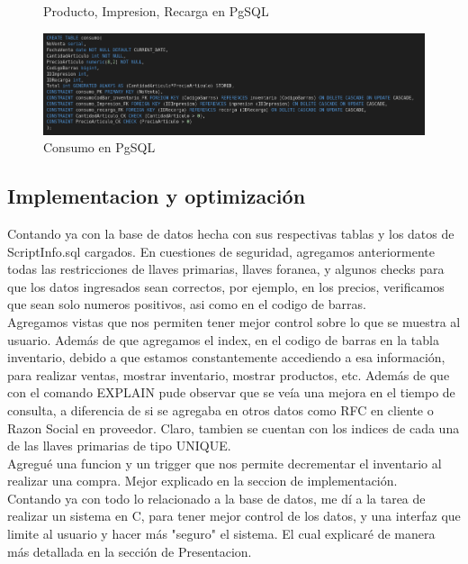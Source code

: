 \documentclass[letter,12pt]{article}
\begin{document}
\begin{center}
\begin{figure}[H]
\caption{Producto, Impresion, Recarga en PgSQL}
\end{figure}
\begin{figure}[H]
\includegraphics[scale=.45]{consumoBD.png}
\caption{Consumo en PgSQL}
\end{figure}
\end{center}
\subsection{Implementacion y optimización}
Contando ya con la base de datos hecha con sus respectivas tablas y los datos de ScriptInfo.sql cargados. En cuestiones de seguridad, agregamos anteriormente todas las restricciones de llaves primarias, llaves foranea, y algunos checks para que los datos ingresados sean correctos, por ejemplo, en los precios, verificamos que sean solo numeros positivos, asi como en el codigo de barras. \\
Agregamos vistas que nos permiten tener mejor control sobre lo que se muestra al usuario. Además de que agregamos el index, en el codigo de barras en la tabla inventario, debido a que estamos constantemente accediendo a esa información, para realizar ventas, mostrar inventario, mostrar productos, etc. Además de que con el comando EXPLAIN pude observar que se veía una mejora en el tiempo de consulta, a diferencia de si se agregaba en otros datos como RFC en cliente o Razon Social en proveedor. Claro, tambien se cuentan con los indices de cada una de las llaves primarias de tipo UNIQUE. \\
Agregué una funcion y un trigger que nos permite decrementar el inventario al realizar una compra. Mejor explicado en la seccion de implementación.\\
Contando ya con todo lo relacionado a la base de datos, me dí a la tarea de realizar un sistema en C, para tener mejor control de los datos, y una interfaz que limite al usuario y hacer más "seguro" el sistema. El cual explicaré de manera más detallada en la sección de Presentacion.
\end{document}
